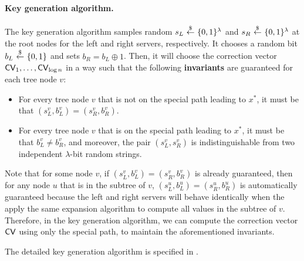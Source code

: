 \paragraph{Key generation algorithm.}
The key generation algorithm samples  
random $s_L ~{\overset{\$}{\leftarrow}}~ \{0, 1\}^\lambda$ and $s_R ~{\overset{\$}{\leftarrow}}~ \{0, 1\}^\lambda$ 
at the root nodes for the left and right servers, respectively.
It chooses a random bit $b_L ~{\overset{\$}{\leftarrow}}~\{0, 1\}$ 
and sets $b_R = b_L \oplus 1$.
Then, it will choose the correction vector ${\sf CV}_1, \ldots, {\sf CV}_{\log n}$
in a way such that 
the following {\bf invariants} are guaranteed for each
tree node $v$:

\begin{itemize}[leftmargin=7mm]
\item 
For every tree node $v$
that is not on the special path leading to $x^*$, 
it must be that $(s_L^v, b_L^v) = (s_R^v, b_R^v)$.
\item 
For every tree node $v$
that is on the special path leading to $x^*$, 
it must be that $b_L^v \neq b_R^v$,
and moreover, the pair $(s_L^v, s_R^v)$ 
is indistinguishable from two independent $\lambda$-bit random 
strings.
\end{itemize}

Note that for some node $v$, if 
$(s_L^v, b_L^v) = (s_R^v, b_R^v)$
is already guaranteed, then 
for any node $u$ that is in the 
subtree of $v$,  
$(s_L^u, b_L^u) = (s_R^u, b_R^u)$
is automatically guaranteed because
the left and right servers
will behave identically when the apply the same 
expansion algorithm to compute 
all values in the subtree of $v$.
Therefore, in the key generation algorithm, 
we can compute the correction vector ${\sf CV}$
using only the special path, to maintain
the aforementioned invariants. 

The detailed key generation algorithm is specified
in .





